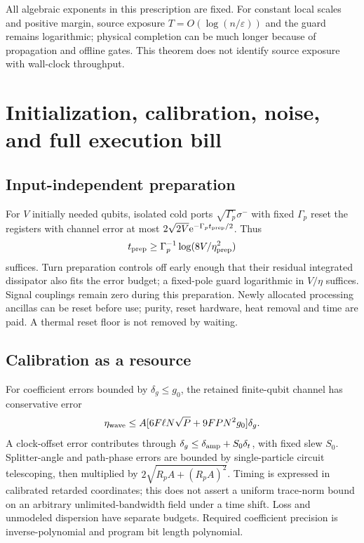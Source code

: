 \documentclass[11pt,a4paper]{article}
\newcommand{\ee}{\mathrm e}
\begin{document}
All algebraic exponents in this prescription are fixed. For constant local scales and positive margin, source exposure $T=O(\log(n/\varepsilon))$ and the guard remains logarithmic; physical completion can be much longer because of propagation and offline gates. This theorem does not identify source exposure with wall-clock throughput.

\section{Initialization, calibration, noise, and full execution bill}
\label{sec:errors}

\subsection{Input-independent preparation}

For $V$ initially needed qubits, isolated cold ports $\sqrt{\Gamma_p}\sigma^-$ with fixed $\Gamma_p$ reset the registers with channel error at most $2\sqrt{2V}\ee^{-\Gamma_p t_{\rm prep}/2}$. Thus
\begin{equation}
 t_{\rm prep}\ge\Gamma_p^{-1}\log(8V/\eta_{\rm prep}^2)
\end{equation}
suffices. Turn preparation controls off early enough that their residual integrated dissipator also fits the error budget; a fixed-pole guard logarithmic in $V/\eta$ suffices. Signal couplings remain zero during this preparation. Newly allocated processing ancillas can be reset before use; purity, reset hardware, heat removal and time are paid. A thermal reset floor is not removed by waiting.

\subsection{Calibration as a resource}

For coefficient errors bounded by $\delta_g\le g_0$, the retained finite-qubit channel has conservative error
\begin{equation}
 \eta_{\rm wave}\le A[6F\ell N\sqrt P+9FPN^2g_0]\delta_g.
 \label{eq:cal}
\end{equation}
A clock-offset error contributes through $\delta_g\le\delta_{\rm amp}+S_0\delta_t$, with fixed slew $S_0$. Splitter-angle and path-phase errors are bounded by single-particle circuit telescoping, then multiplied by $2\sqrt{R_pA+(R_pA)^2}$. Timing is expressed in calibrated retarded coordinates; this does not assert a uniform trace-norm bound on an arbitrary unlimited-bandwidth field under a time shift. Loss and unmodeled dispersion have separate budgets. Required coefficient precision is inverse-polynomial and program bit length polynomial.
\end{document}
